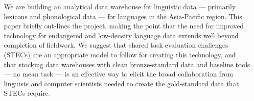 We are building an analytical data warehouse for linguistic data --- primarily lexicons and phonological data --- for languages in the Asia-Pacific region. This paper briefly out-lines the project, making the point that the need for improved technology for endangered and low-density language data extends well beyond completion of fieldwork.  We suggest that shared task evaluation challenges (STECs) are an appropriate model to follow for creating this technology, and that stocking data warehouses with clean bronze-standard data and baseline tools --- no mean task --- is an effective way to elicit the broad collaboration from linguists and computer scientists needed to create the gold-standard data that STECs require.
